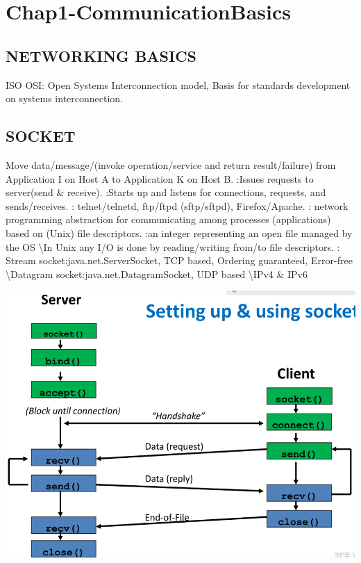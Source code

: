 \section{Chap1-CommunicationBasics}
\subsection*{NETWORKING BASICS}
ISO OSI: Open Systems Interconnection model, Basis for standards development on systems interconnection.
\subsection*{SOCKET}
Move data/message/(invoke operation/service and return result/failure) from Application I on Host A to Application K on Host B.
:Issues requests to server(send \& receive).
:Starts up and listens for connections, requests, and sends/receives.
: telnet/telnetd, ftp/ftpd (sftp/sftpd), Firefox/Apache.
: network programming abstraction for communicating among processes (applications) based on (Unix) file
descriptors.
:an integer representing an open file managed by the OS \textbackslash In Unix any I/O is done by reading/writing from/to file
descriptors.
: 
Stream socket:java.net.ServerSocket, TCP based, Ordering guaranteed, Error-free 
\textbackslash Datagram socket:java.net.DatagramSocket, UDP based 
\textbackslash IPv4 \& IPv6

\includegraphics[width=.8\linewidth]{chap1_1.png}
